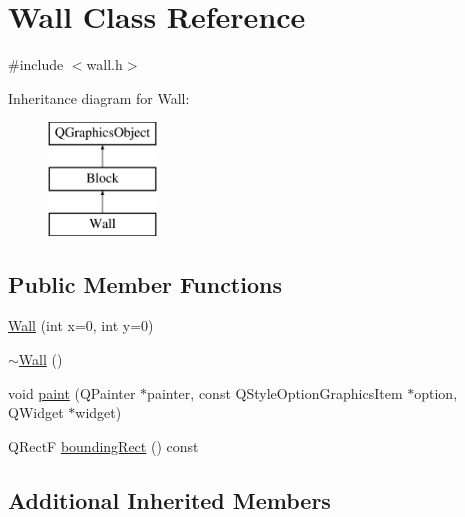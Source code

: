\hypertarget{class_wall}{\section{Wall Class Reference}
\label{class_wall}
}


{\ttfamily \#include $<$wall.\-h$>$}

Inheritance diagram for Wall\-:\begin{figure}[H]
\begin{center}
\leavevmode
\includegraphics[height=3.000000cm]{class_wall}
\end{center}
\end{figure}
\subsection*{Public Member Functions}
\begin{DoxyCompactItemize}
\item 
\hyperlink{class_wall_a23004a32bc2720e18793d6db6a5f0fd5}{Wall} (int x=0, int y=0)
\item 
\hyperlink{class_wall_a9a2992f2b533e1c160513d1e719f920c}{$\sim$\-Wall} ()
\item 
void \hyperlink{class_wall_aae57ed47f7d5d58b513d2ebd8feb8057}{paint} (Q\-Painter $\ast$painter, const Q\-Style\-Option\-Graphics\-Item $\ast$option, Q\-Widget $\ast$widget)
\item 
Q\-Rect\-F \hyperlink{class_wall_aae7888200bcd5afb12b24110886366a0}{bounding\-Rect} () const 
\end{DoxyCompactItemize}
\subsection*{Additional Inherited Members}


